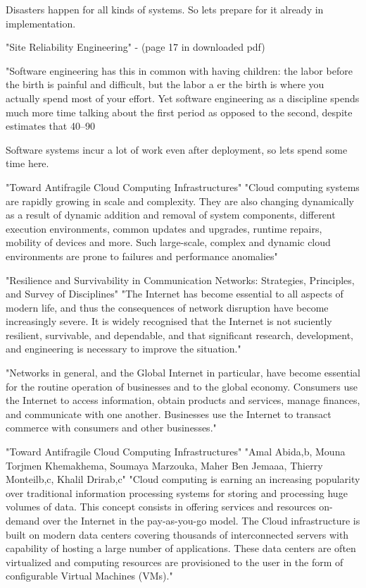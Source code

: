 {Disasters happen for all kinds of systems. So lets prepare for it already in implementation.


"Site Reliability Engineering" - (page 17 in downloaded pdf)

"Software engineering has this in common with having children: the labor before the birth is painful and difficult, but the labor a er the birth is where you actually spend most of your effort. Yet software engineering as a discipline spends much more time talking about the first period as opposed to the second, despite estimates that 40–90%


Software systems incur a lot of work even after deployment, so lets spend some time here.

"Toward Antifragile Cloud Computing Infrastructures"\cite{abid2014toward}
"Cloud computing systems are rapidly growing in scale and complexity. They are also changing dynamically as a result of dynamic addition and removal of system components, different execution environments, common updates and upgrades, runtime repairs, mobility of devices and more. Such large-scale, complex and dynamic cloud environments are prone to failures and performance anomalies"

"Resilience and Survivability in Communication Networks: Strategies, Principles, and Survey of Disciplines"\cite{sterbenz2010resilience}
"The Internet has become essential to all aspects of modern life, and thus the consequences of network disruption have become increasingly severe. It is widely recognised that the Internet is not suciently resilient, survivable, and dependable, and that significant research, development, and engineering is necessary to improve the situation."

"Networks in general, and the Global Internet in particular, have become essential for the routine operation of businesses and to the global economy. Consumers use the Internet to access information, obtain products and services, manage finances, and communicate with one another. Businesses use the Internet to transact commerce with consumers and other businesses."


"Toward Antifragile Cloud Computing Infrastructures" "Amal Abida,b, Mouna Torjmen Khemakhema, Soumaya Marzouka, Maher Ben Jemaaa, Thierry Monteilb,c, Khalil Drirab,c"
"Cloud computing is earning an increasing popularity over traditional information processing systems for storing and processing huge volumes of data. This concept consists in offering services and resources on-demand over the Internet in the pay-as-you-go model. The Cloud infrastructure is built on modern data centers covering thousands of interconnected servers with capability of hosting a large number of applications. These data centers are often virtualized and computing resources are provisioned to the user in the form of configurable Virtual Machines (VMs)."

}
